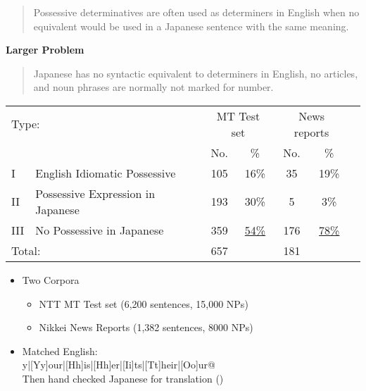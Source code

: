 \documentclass[a4paper,landscape,headrule,footrule,xetex]{foils}
\begin{document}



\vspace{-4ex}
\begin{quote}
  Possessive determinatives are often used as determiners in English
  when no equivalent would be used in a Japanese sentence with the
  same meaning.
\end{quote}

{\bf Larger Problem}
\begin{quote}
  Japanese has no syntactic equivalent to determiners in English,
  no articles, and noun phrases are normally not marked for number.
\end{quote}




\noindent\begin{tabular}{llccccc}
  \multicolumn{2}{l}{Type:}  &
  \multicolumn{2}{c}{MT Test set} &
  \multicolumn{2}{c}{News reports} \\
   & & No.  & \%  & No.  & \%  \\ \hline
   I & English Idiomatic Possessive & 105 & 16\% & 35 & 19\% \\
   II & Possessive Expression in Japanese & 193 & 30\% & 5 & 3\% \\
   III &No Possessive in Japanese & 359 &  \underline{54\%}& 176 & \underline{78\%} \\
  \multicolumn{2}{l}{Total:} &  657 & & 181 & 
\end{tabular}

\begin{itemize}
\item Two Corpora
  \begin{itemize}
  \item NTT MT Test set (6,200 sentences, 15,000 NPs)
  \item Nikkei News Reports (1,382 sentences, 8000 NPs)
  \end{itemize}
\item Matched English:
\\  \verb@[Mm]y|[Yy]our|[Hh]is|[Hh]er|[Ii]ts|[Tt]heir|[Oo]ur@
\\ Then hand checked Japanese for translation ()
\end{itemize}

\end{document}
